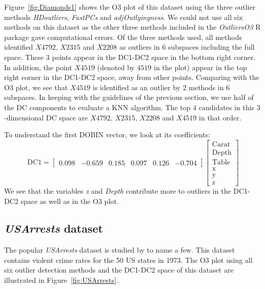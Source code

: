 \documentclass[a4paper,11pt]{article}
\begin{document}
Figure~\ref{fig:Diamonds1} shows the O3 plot of this dataset using the three outlier methods \textit{HDoutliers}, \textit{FastPCs} and \textit{adjOutlyingness}. We could not use all six methods on this dataset as the other three methods included in the \textit{OutliersO3} R package gave computational errors. Of the three methods used, all methods identified $X4792$, $X2315$ and $X2208$ as outliers in 6 subspaces including the full space. These $3$ points appear in the DC1-DC2 space in the bottom right corner. In addition, the point $X4519$ (denoted by $4519$ in the plot) appear in the top right corner in the DC1-DC2 space, away from other points. Comparing with the O3 plot, we see that $X4519$ is identified as an outlier by $2$ methods in $6$ subspaces. In keeping with the guidelines of the previous section, we use half of the DC components to evaluate a KNN algorithm. The top $4$ candidates in this $3$-dimensional DC space are $X4792$, $X2315$, $X2208$ and $X4519$ in that order.

To understand the first DOBIN vector, we look at its coefficients:
\begin{equation}\label{eq:ResWithVis2}
    \text{DC1} = \begin{bmatrix}
    0.098 & -0.659 &  0.185 & 0.097  & 0.126 & -0.704
    \end{bmatrix}
    \begin{bmatrix}
    \text{Carat} \\
    \text{Depth} \\
    \text{Table} \\
    \text{x} \\
    \text{y} \\
    \text{z}
    \end{bmatrix}
\end{equation}
We see that the variables \textit{z} and \textit{Depth} contribute more  to  outliers in the DC1-DC2 space as well as in the O3 plot.


\subsection{\textit{USArrests} dataset}\label{sec:ResWithVis3}
The popular \textit{USArrests} dataset  is studied by \cite{bailey1995interactive, sarkar2008labels, yaminiviolent} to name a few. This dataset contains violent crime rates for the 50 US states in 1973. The O3 plot using all six outlier detection methods and the DC1-DC2 space of this dataset are illustrated in Figure~\ref{fig:USArrests}.
\end{document}
